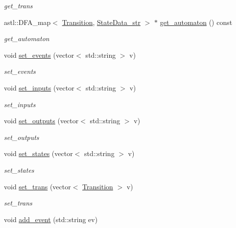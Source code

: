 \begin{DoxyCompactItemize}
\begin{DoxyCompactList}\small\item\em get\+\_\+trans \end{DoxyCompactList}\item 
astl\+::\+D\+F\+A\+\_\+map$<$ \hyperlink{class_transition}{Transition}, \hyperlink{class_state_data__str}{State\+Data\+\_\+str} $>$ $\ast$ \hyperlink{class_component_model_a6ebfb1ee56c82313e9305462e29d0fc1}{get\+\_\+automaton} () const 
\begin{DoxyCompactList}\small\item\em get\+\_\+automaton \end{DoxyCompactList}\item 
void \hyperlink{class_component_model_a62c871017dcb565d2ffea30f2bf64eab}{set\+\_\+events} (vector$<$ std\+::string $>$ v)
\begin{DoxyCompactList}\small\item\em set\+\_\+events \end{DoxyCompactList}\item 
void \hyperlink{class_component_model_a6066f9a643b19ce2a3a8922c957db8d1}{set\+\_\+inputs} (vector$<$ std\+::string $>$ v)
\begin{DoxyCompactList}\small\item\em set\+\_\+inputs \end{DoxyCompactList}\item 
void \hyperlink{class_component_model_ae87ec7dc958cfc89815472970d90fdc6}{set\+\_\+outputs} (vector$<$ std\+::string $>$ v)
\begin{DoxyCompactList}\small\item\em set\+\_\+outputs \end{DoxyCompactList}\item 
void \hyperlink{class_component_model_ac5510406a3ebbc0aec567973d9f02d44}{set\+\_\+states} (vector$<$ std\+::string $>$ v)
\begin{DoxyCompactList}\small\item\em set\+\_\+states \end{DoxyCompactList}\item 
void \hyperlink{class_component_model_a7ccd13a1905914b08d079ac3e89d7ef9}{set\+\_\+trans} (vector$<$ \hyperlink{class_transition}{Transition} $>$ v)
\begin{DoxyCompactList}\small\item\em set\+\_\+trans \end{DoxyCompactList}\item 
void \hyperlink{class_component_model_a0c56c8a83e2af3bf68bc5bd820607ed5}{add\+\_\+event} (std\+::string ev)

\end{DoxyCompactItemize}

